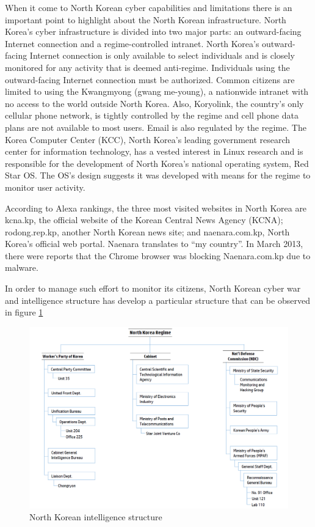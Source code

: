 \documentclass[12pt]{article}
\begin{document}
        When it come to North Korean cyber capabilities and limitations there is an important point to highlight about the North Korean infrastructure. North Korea’s cyber infrastructure is divided into two major parts: an outward-facing Internet connection and a regime-controlled intranet. North Korea’s outward-facing Internet connection is only available to select individuals and is closely monitored for any activity that is deemed anti-regime. Individuals using the outward-facing Internet connection must be authorized. Common citizens are limited to using the Kwangmyong (gwang me-young), a nationwide intranet with no access to the world outside North Korea. Also, Koryolink, the country’s only cellular phone network, is tightly controlled by the regime and cell phone data plans are not available to most users. Email is also regulated by the regime. The Korea Computer Center (KCC), North Korea’s leading government research center for information technology, has a vested interest in Linux research and is responsible for the development of North Korea’s national operating system, Red Star OS. The OS’s design suggests it was developed with means for the regime to monitor user activity. 
        
        According to Alexa rankings, the three most visited websites in North Korea are kcna.kp, the official website of the Korean Central News Agency (KCNA); rodong.rep.kp, another North Korean news site; and naenara.com.kp, North Korea’s official web portal. Naenara translates to “my country”. In March 2013, there were reports that the Chrome browser was blocking Naenara.com.kp due to malware.
        
        In order to manage such effort to monitor its citizens, North Korean cyber war and intelligence structure has develop a particular structure that can be observed in figure \ref{fig:structure}
        
        \begin{figure}[H]
        \centering
        \includegraphics[width=\textwidth,cfbox=red 0.1mm 0.1mm]{figures/struttura.png}
        \caption{North Korean intelligence structure}
        \label{fig:structure}
        \end{figure}
        
\end{document}
